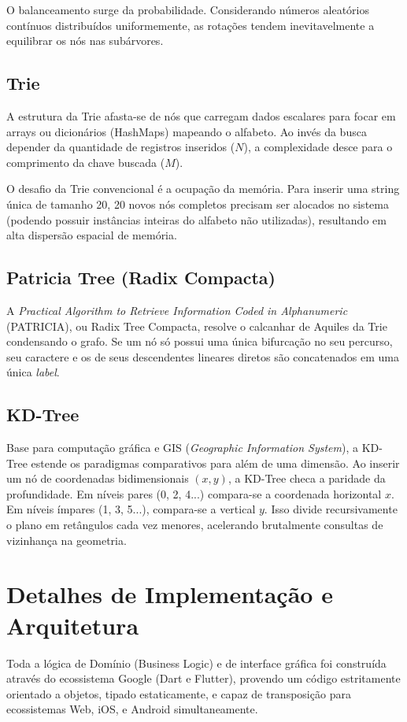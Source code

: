 \documentclass[12pt,a4paper]{article}
\begin{document}
O balanceamento surge da probabilidade. Considerando números aleatórios contínuos distribuídos uniformemente, as rotações tendem inevitavelmente a equilibrar os nós nas subárvores.

\subsection{Trie}
A estrutura da Trie afasta-se de nós que carregam dados escalares para focar em arrays ou dicionários (HashMaps) mapeando o alfabeto. Ao invés da busca depender da quantidade de registros inseridos ($N$), a complexidade desce para o comprimento da chave buscada ($M$). 

O desafio da Trie convencional é a ocupação da memória. Para inserir uma string única de tamanho 20, 20 novos nós completos precisam ser alocados no sistema (podendo possuir instâncias inteiras do alfabeto não utilizadas), resultando em alta dispersão espacial de memória.

\subsection{Patricia Tree (Radix Compacta)}
A \textit{Practical Algorithm to Retrieve Information Coded in Alphanumeric} (PATRICIA), ou Radix Tree Compacta, resolve o calcanhar de Aquiles da Trie condensando o grafo. Se um nó só possui uma única bifurcação no seu percurso, seu caractere e os de seus descendentes lineares diretos são concatenados em uma única \textit{label}. 

\subsection{KD-Tree}
Base para computação gráfica e GIS (\textit{Geographic Information System}), a KD-Tree estende os paradigmas comparativos para além de uma dimensão. Ao inserir um nó de coordenadas bidimensionais $(x, y)$, a KD-Tree checa a paridade da profundidade. Em níveis pares (0, 2, 4...) compara-se a coordenada horizontal $x$. Em níveis ímpares (1, 3, 5...), compara-se a vertical $y$. Isso divide recursivamente o plano em retângulos cada vez menores, acelerando brutalmente consultas de vizinhança na geometria.

\section{Detalhes de Implementação e Arquitetura}
Toda a lógica de Domínio (Business Logic) e de interface gráfica foi construída através do ecossistema Google (Dart e Flutter), provendo um código estritamente orientado a objetos, tipado estaticamente, e capaz de transposição para ecossistemas Web, iOS, e Android simultaneamente.
\end{document}
